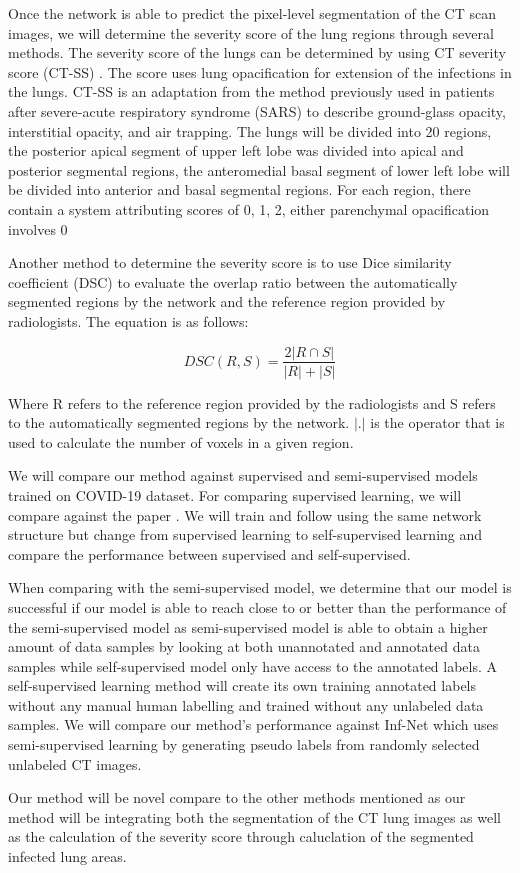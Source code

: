 Once the network is able to predict the pixel-level segmentation of the CT scan images, we will determine the severity score of the lung regions through several methods. The severity score of the lungs can be determined by using CT severity score (CT-SS) \cite{ref11}. The score uses lung opacification for extension of the infections in the lungs. CT-SS is an adaptation from the method previously used in patients after severe-acute respiratory syndrome (SARS) \cite{ref10} to describe ground-glass opacity, interstitial opacity, and air trapping. The lungs will be divided into 20 regions, the posterior apical segment of upper left lobe was divided into apical and posterior segmental regions, the anteromedial basal segment of lower left lobe will be divided into anterior and basal segmental regions. For each region, there contain a system attributing scores of 0, 1, 2, either parenchymal opacification involves 0%

Another method to determine the severity score is to use Dice similarity coefficient (DSC) \cite{ref12}  to evaluate the overlap ratio between the automatically segmented regions by the network and the reference region provided by radiologists. The equation is as follows:

\begin{equation}
DSC(R,S)=\frac{2|R\cap S|}{|R|+|S|}
\end{equation}

Where R refers to the reference region provided by the radiologists and S refers to the automatically segmented regions by the network. $|.|$
is the operator that is used to calculate the number of voxels in a given region.

We will compare our method against supervised and semi-supervised \cite{ref13,ref14} models trained on COVID-19 dataset. For comparing supervised learning, we will compare against the paper \cite{ref13}. We will train and follow using the same network structure but change from supervised learning to self-supervised learning and compare the performance between supervised and self-supervised.

When comparing with the semi-supervised model, we determine that our model is successful if our model is able to reach close to or better than the performance of the semi-supervised model as semi-supervised model is able to obtain a higher amount of data samples by looking at both unannotated and annotated data samples while self-supervised model only have access to the annotated labels. A self-supervised learning method will create its own training annotated labels without any manual human labelling and trained without any unlabeled data samples. We will compare our method’s performance against Inf-Net \cite{ref14} which uses semi-supervised learning by generating pseudo labels from randomly selected unlabeled CT images.

Our method will be novel compare to the other methods mentioned as our method will be integrating both the segmentation of the CT lung images as well as the calculation of the severity score through caluclation of the segmented infected lung areas.



